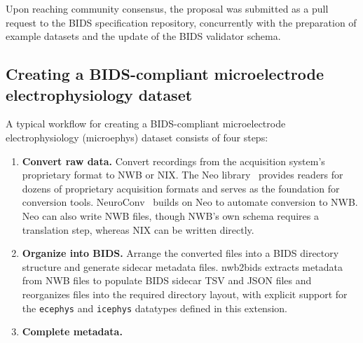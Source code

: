 \documentclass[fleqn,10pt]{article}
\begin{document}
Upon reaching community consensus, the proposal was submitted as a pull request to the BIDS specification repository, concurrently with the preparation of example datasets and the update of the BIDS validator schema.

\subsection*{Creating a BIDS-compliant microelectrode electrophysiology dataset}\label{sec:creating-dataset}

A typical workflow for creating a BIDS-compliant microelectrode electrophysiology  (microephys) dataset consists of four steps:
\begin{enumerate}[noitemsep]
	\item \textbf{Convert raw data.}
	      Convert recordings from the acquisition system's proprietary format to NWB or NIX\@.
	      The Neo library~\citep{garcia_neo_2014} provides readers for dozens of proprietary acquisition formats and serves as the foundation for conversion tools.
          NeuroConv~\citep{mayorquin_neuroconv_2025} builds on Neo to automate conversion to NWB. Neo can also write NWB files, though NWB's own schema requires a translation step, whereas NIX can be written directly.
	\item \textbf{Organize into BIDS.}
	      Arrange the converted files into a BIDS directory structure and generate sidecar metadata files.
	      nwb2bids \citep{nwb2bids_zenodo} extracts metadata from NWB files to populate BIDS sidecar TSV and JSON files and reorganizes files into the required directory layout, with explicit support for the \texttt{ecephys} and \texttt{icephys} datatypes defined in this extension.
	\item \textbf{Complete metadata.}

\end{enumerate}
\end{document}

